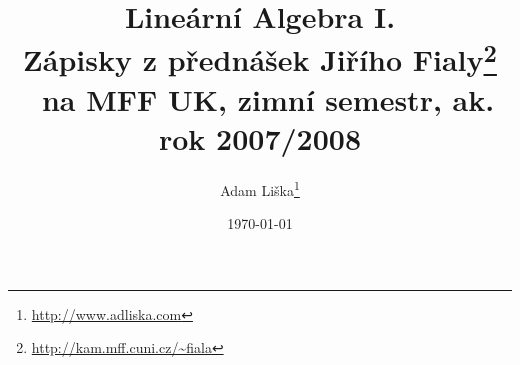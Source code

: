 \documentclass[12pt]{article}
\theoremstyle{definition}
\begin{document}
\title{Lineární Algebra I. \\ 
\vspace{1 mm} {\normalsize Zápisky z přednášek Jiřího 
    Fialy\footnote{\url{http://kam.mff.cuni.cz/~fiala}} \ na MFF UK, 
    zimní semestr, ak. rok 2007/2008}}

\author{Adam Li\v{s}ka\footnote{\url{http://www.adliska.com}}}

\date{\today}


\maketitle

\newpage
\tableofcontents










\end{document}
